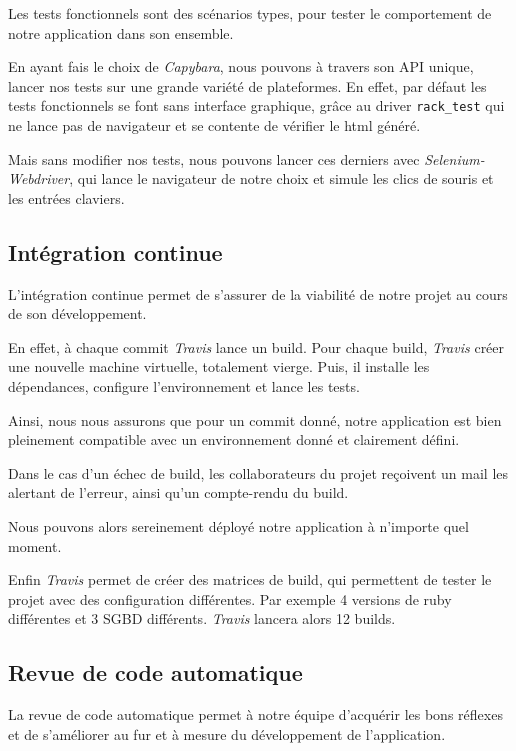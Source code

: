 \documentclass[a4paper,11pt]{article}
\begin{document}
Les tests fonctionnels sont des scénarios types, pour tester le comportement de notre application dans son ensemble.

En ayant fais le choix de \textit{Capybara}, nous pouvons à travers son API unique, lancer nos tests sur une grande variété de plateformes. En effet, par défaut les tests fonctionnels se font sans interface graphique, grâce au driver \verb!rack_test! qui ne lance pas de navigateur et se contente de vérifier le html généré. 

Mais sans modifier nos tests, nous pouvons lancer ces derniers avec \textit{Selenium-Webdriver}, qui lance le navigateur de notre choix et simule les clics de souris et les entrées claviers.

\subsection{Intégration continue}

L'intégration continue permet de s'assurer de la viabilité de notre projet au cours de son développement.

En effet, à chaque commit \textit{Travis} lance un build. Pour chaque build, \textit{Travis} créer une nouvelle machine virtuelle, totalement vierge. Puis, il installe les dépendances, configure l'environnement et lance les tests.

Ainsi, nous nous assurons que pour un commit donné, notre application est bien pleinement compatible avec un environnement donné et clairement défini.

Dans le cas d'un échec de build, les collaborateurs du projet reçoivent un mail les alertant de l'erreur, ainsi qu'un compte-rendu du build.

Nous pouvons alors sereinement déployé notre application à n'importe quel moment.

Enfin \textit{Travis} permet de créer des matrices de build, qui permettent de tester le projet avec des configuration différentes. Par exemple 4 versions de ruby différentes et 3 SGBD différents. \textit{Travis} lancera alors 12 builds.

\subsection{Revue de code automatique}

La revue de code automatique permet à notre équipe d'acquérir les bons réflexes et de s'améliorer au fur et à mesure du développement de l'application.
\end{document}
